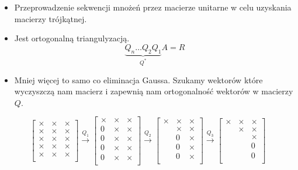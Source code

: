 \documentclass[a4paper]{article}
\begin{document}
\begin{itemize}
    \item Przeprowadzenie sekwencji mnożeń przez macierze unitarne w celu uzyskania macierzy trójkątnej.
    \item Jest ortogonalną triangulyzacją.
    \begin{equation*}
        \underbrace{Q_n \dots Q_2Q_1}_{Q^*} A = R
    \end{equation*}
    \item Mniej więcej to samo co eliminacja Gaussa. Szukamy wektorów które wyczyszczą nam macierz i zapewnią nam ortogonalność wektorów w macierzy $Q$.
\end{itemize}
\begin{equation*}
    \begin{bmatrix}
        \times & \times & \times \\
        \times & \times & \times \\
        \times & \times & \times \\
        \times & \times & \times \\
        \times & \times & \times \\
    \end{bmatrix}
    \xrightarrow{Q_1}
    \begin{bmatrix}
        \times & \times & \times \\
        0 & \times & \times \\
        0 & \times & \times \\
        0 & \times & \times \\
        0 & \times & \times \\
    \end{bmatrix}
    \xrightarrow{Q_2}
    \begin{bmatrix}
        \times & \times & \times \\
        & \times & \times \\
        & 0 & \times \\
        & 0 & \times \\
        & 0 & \times \\
    \end{bmatrix}
    \xrightarrow{Q_3}
    \begin{bmatrix}
        \times & \times & \times \\
        & \times & \times \\
        & & \times \\
        & & 0 \\
        & & 0 \\
    \end{bmatrix}
\end{equation*}
\end{document}
